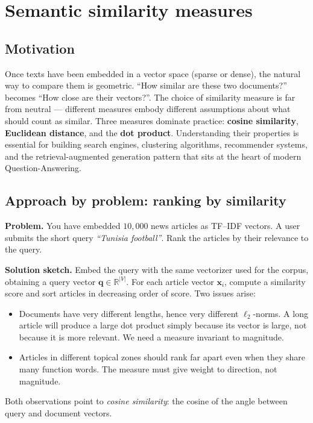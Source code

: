 \section{Semantic similarity measures}

\subsection{Motivation}
Once texts have been embedded in a vector space (sparse or dense), the natural way to compare them is geometric. ``How similar are these two documents?'' becomes ``How close are their vectors?''. The choice of similarity measure is far from neutral --- different measures embody different assumptions about what should count as similar. Three measures dominate practice: \textbf{cosine similarity}, \textbf{Euclidean distance}, and the \textbf{dot product}. Understanding their properties is essential for building search engines, clustering algorithms, recommender systems, and the retrieval-augmented generation pattern that sits at the heart of modern Question-Answering.

\subsection{Approach by problem: ranking by similarity}
\textbf{Problem.} You have embedded $10{,}000$ news articles as TF--IDF vectors. A user submits the short query \emph{``Tunisia football''}. Rank the articles by their relevance to the query.

\textbf{Solution sketch.} Embed the query with the same vectorizer used for the corpus, obtaining a query vector $\mathbf{q} \in \mathbb{R}^{|V|}$. For each article vector $\mathbf{x}_i$, compute a similarity score and sort articles in decreasing order of score. Two issues arise:
\begin{itemize}
    \item Documents have very different lengths, hence very different $\ell_2$-norms. A long article will produce a large dot product simply because its vector is large, not because it is more relevant. We need a measure invariant to magnitude.
    \item Articles in different topical zones should rank far apart even when they share many function words. The measure must give weight to direction, not magnitude.
\end{itemize}
Both observations point to \emph{cosine similarity}: the cosine of the angle between query and document vectors.

